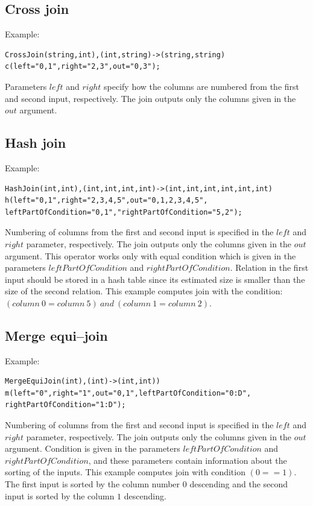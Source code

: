 \subsection{Cross join}
Example:
\begin{lstlisting} 
CrossJoin(string,int),(int,string)->(string,string)
c(left="0,1",right="2,3",out="0,3");
\end{lstlisting}
Parameters $left$ and $right$ specify how the columns are numbered from the first and second input, respectively. The join outputs only the columns given in the $out$ argument. 

\subsection{Hash join}
Example:
\begin{lstlisting}
HashJoin(int,int),(int,int,int,int)->(int,int,int,int,int,int)
h(left="0,1",right="2,3,4,5",out="0,1,2,3,4,5",
leftPartOfCondition="0,1","rightPartOfCondition="5,2"); 
\end{lstlisting}
Numbering of columns from the first and second input is specified in the $left$ and $right$ parameter, respectively. The join outputs only the columns given in the $out$ argument. This operator works only with equal condition which is given in the parameters $leftPartOfCondition$ and $rightPartOfCondition$. Relation in the first input should be stored in a hash table since its estimated size is smaller than the size of the second relation. This example computes join with the condition:\\
 $(column~0=column~5)~and~(column~1=column~2)$.

\subsection{Merge equi--join}
Example:
\begin{lstlisting}
MergeEquiJoin(int),(int)->(int,int))
m(left="0",right="1",out="0,1",leftPartOfCondition="0:D",
rightPartOfCondition="1:D");
\end{lstlisting}
Numbering of columns from the first and second input is specified in the $left$ and $right$ parameter, respectively. The join outputs only the columns given in the $out$ argument. Condition is given in the parameters $leftPartOfCondition$ and $rightPartOfCondition$, and these parameters contain information about the sorting of the inputs. This example computes join with condition $(0==1)$. The first input is sorted by the column number $0$ descending and the second input is sorted by the column $1$ descending.

